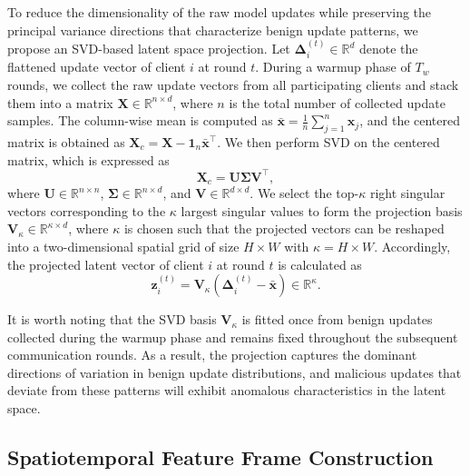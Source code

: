 To reduce the dimensionality of the raw model updates while preserving the principal variance directions that characterize benign update patterns, we propose an SVD-based latent space projection. Let $\boldsymbol{\Delta}_i^{(t)} \in \mathbb{R}^d$ denote the flattened update vector of client $i$ at round $t$. During a warmup phase of $T_w$ rounds, we collect the raw update vectors from all participating clients and stack them into a matrix $\mathbf{X} \in \mathbb{R}^{n \times d}$, where $n$ is the total number of collected update samples. The column-wise mean is computed as $\bar{\mathbf{x}} = \frac{1}{n} \sum_{j=1}^{n} \mathbf{x}_j$, and the centered matrix is obtained as $\mathbf{X}_c = \mathbf{X} - \mathbf{1}_n \bar{\mathbf{x}}^\top$. We then perform SVD on the centered matrix, which is expressed as
\begin{equation}\label{eq:svd}
    \mathbf{X}_c = \mathbf{U} \boldsymbol{\Sigma} \mathbf{V}^\top,
\end{equation}
where $\mathbf{U} \in \mathbb{R}^{n \times n}$, $\boldsymbol{\Sigma} \in \mathbb{R}^{n \times d}$, and $\mathbf{V} \in \mathbb{R}^{d \times d}$. We select the top-$\kappa$ right singular vectors corresponding to the $\kappa$ largest singular values to form the projection basis $\mathbf{V}_\kappa \in \mathbb{R}^{\kappa \times d}$, where $\kappa$ is chosen such that the projected vectors can be reshaped into a two-dimensional spatial grid of size $H \times W$ with $\kappa = H \times W$. Accordingly, the projected latent vector of client $i$ at round $t$ is calculated as
\begin{equation}\label{eq:svd_proj}
    \mathbf{z}_i^{(t)} = \mathbf{V}_\kappa \left( \boldsymbol{\Delta}_i^{(t)} - \bar{\mathbf{x}} \right) \in \mathbb{R}^{\kappa}.
\end{equation}

It is worth noting that the SVD basis $\mathbf{V}_\kappa$ is fitted once from benign updates collected during the warmup phase and remains fixed throughout the subsequent communication rounds. As a result, the projection captures the dominant directions of variation in benign update distributions, and malicious updates that deviate from these patterns will exhibit anomalous characteristics in the latent space.

\subsection{Spatiotemporal Feature Frame Construction}\label{subsec:feature_construction}

